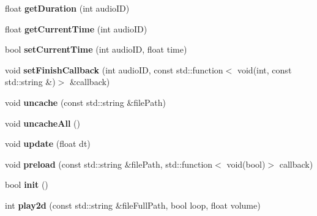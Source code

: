 \begin{DoxyCompactItemize}
float {\bfseries get\+Duration} (int audio\+ID)
\item 
\mbox{\label{classexperimental_1_1AudioEngineImpl_a47be5365efeebd307e3891f3f71386f0}} 
float {\bfseries get\+Current\+Time} (int audio\+ID)
\item 
\mbox{\label{classexperimental_1_1AudioEngineImpl_a8abd3b8330fb7ca7f513016055333f9c}} 
bool {\bfseries set\+Current\+Time} (int audio\+ID, float time)
\item 
\mbox{\label{classexperimental_1_1AudioEngineImpl_ab4bc0ee1754fda9638d7d0c4470cf170}} 
void {\bfseries set\+Finish\+Callback} (int audio\+ID, const std\+::function$<$ void(int, const std\+::string \&)$>$ \&callback)
\item 
\mbox{\label{classexperimental_1_1AudioEngineImpl_a4ad8d3d499bf3e5fd262d710b215891e}} 
void {\bfseries uncache} (const std\+::string \&file\+Path)
\item 
\mbox{\label{classexperimental_1_1AudioEngineImpl_ae439dacc5acebf311686ebf6f1f6b3df}} 
void {\bfseries uncache\+All} ()
\item 
\mbox{\label{classexperimental_1_1AudioEngineImpl_a0aa9187ac5e5341a505cf6154feceaee}} 
void {\bfseries update} (float dt)
\item 
\mbox{\label{classexperimental_1_1AudioEngineImpl_aa90d0fa798010a1a9029ab48db51b240}} 
void {\bfseries preload} (const std\+::string \&file\+Path, std\+::function$<$ void(bool)$>$ callback)
\item 
\mbox{\label{classexperimental_1_1AudioEngineImpl_a908e5136201a8a6b53ae5c292329f82b}} 
bool {\bfseries init} ()
\item 
\mbox{\label{classexperimental_1_1AudioEngineImpl_a04b788a8319f5d7f90e297a2a345f745}} 
int {\bfseries play2d} (const std\+::string \&file\+Full\+Path, bool loop, float volume)

\end{DoxyCompactItemize}
